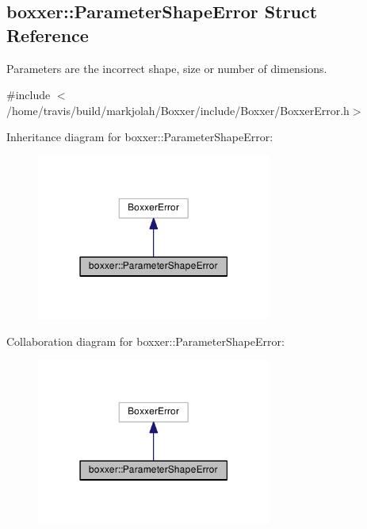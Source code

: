 \hypertarget{structboxxer_1_1ParameterShapeError}{}\subsection{boxxer\+:\+:Parameter\+Shape\+Error Struct Reference}
\label{structboxxer_1_1ParameterShapeError}


Parameters are the incorrect shape, size or number of dimensions.  




{\ttfamily \#include $<$/home/travis/build/markjolah/\+Boxxer/include/\+Boxxer/\+Boxxer\+Error.\+h$>$}



Inheritance diagram for boxxer\+:\+:Parameter\+Shape\+Error\+:\nopagebreak
\begin{figure}[H]
\begin{center}
\leavevmode
\includegraphics[width=219pt]{structboxxer_1_1ParameterShapeError__inherit__graph}
\end{center}
\end{figure}


Collaboration diagram for boxxer\+:\+:Parameter\+Shape\+Error\+:\nopagebreak
\begin{figure}[H]
\begin{center}
\leavevmode
\includegraphics[width=219pt]{structboxxer_1_1ParameterShapeError__coll__graph}
\end{center}
\end{figure}
